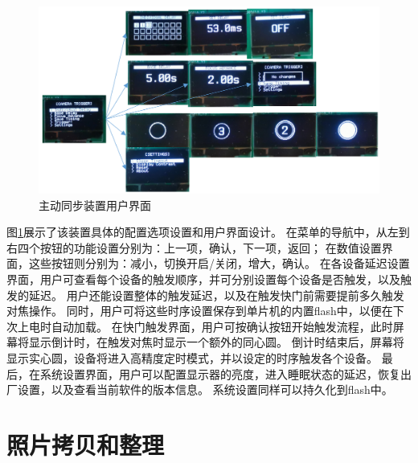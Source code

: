 \documentclass{ctexart}
\begin{document}
\begin{figure}
    \centering
    \includegraphics[width=\textwidth]{figures/active_sync_ui}
    \caption{主动同步装置用户界面}
    \label{fig:active_sync_ui}
\end{figure}
图\ref{fig:active_sync_ui}展示了该装置具体的配置选项设置和用户界面设计。
在菜单的导航中，从左到右四个按钮的功能设置分别为：上一项，确认，下一项，返回；
在数值设置界面，这些按钮则分别为：减小，切换开启/关闭，增大，确认。
在各设备延迟设置界面，用户可查看每个设备的触发顺序，并可分别设置每个设备是否触发，以及触发的延迟。
用户还能设置整体的触发延迟，以及在触发快门前需要提前多久触发对焦操作。
同时，用户可将这些时序设置保存到单片机的内置flash中，以便在下次上电时自动加载。
在快门触发界面，用户可按确认按钮开始触发流程，此时屏幕将显示倒计时，在触发对焦时显示一个额外的同心圆。
倒计时结束后，屏幕将显示实心圆，设备将进入高精度定时模式，并以设定的时序触发各个设备。
最后，在系统设置界面，用户可以配置显示器的亮度，进入睡眠状态的延迟，恢复出厂设置，以及查看当前软件的版本信息。
系统设置同样可以持久化到flash中。

\section{照片拷贝和整理}
\end{document}
